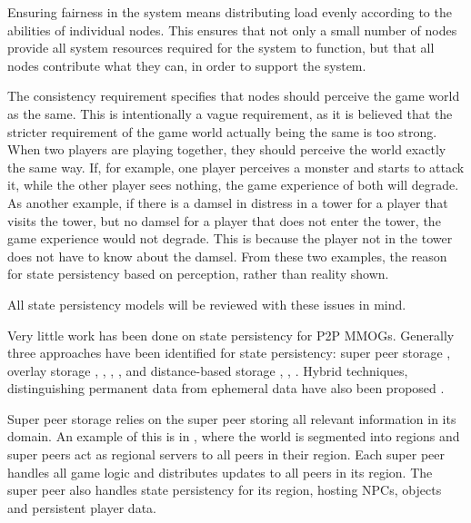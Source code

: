 \documentclass[journal,oneside,a4paper,onecolumn]{IEEEtran}
\begin{document}
Ensuring fairness in the system means distributing load evenly according to the abilities of individual nodes. This ensures that not only a small number of nodes provide all system resources required for the system to function, but that all nodes contribute what they can, in order to support the system.

The consistency requirement specifies that nodes should perceive the game world as the same. This is intentionally a vague requirement, as it is believed that the stricter requirement of the game world actually being the same is too strong. When two players are playing together, they should perceive the world exactly the same way. If, for example, one player perceives a monster and starts to attack it, while the other player sees nothing, the game experience of both will degrade. As another example, if there is a damsel in distress in a tower for a player that visits the tower, but no damsel for a player that does not enter the tower, the game experience would not degrade. This is because the player not in the tower does not have to know about the damsel. From these two examples, the reason for state persistency based on perception, rather than reality shown.

All state persistency models will be reviewed with these issues in mind.

Very little work has been done on state persistency for P2P MMOGs. Generally three approaches have been identified for state persistency: super peer storage \cite{knutsson_p2p_first}, overlay storage \cite{Douglas05enablingmassively}, \cite{using_freenet_storage}, \cite{overlay_storage1}, \cite{Fan_phd}, \cite{past_storage_focus} and distance-based storage \cite{Buyukkaya_voronoi_state_management}, \cite{Hu_voronoi_IM}, \cite{colyseus_distance_based}. Hybrid techniques, distinguishing permanent data from ephemeral data have also been proposed \cite{zoned_federation}.

Super peer storage relies on the super peer storing all relevant information in its domain. An example of this is in \cite{knutsson_p2p_first}, where the world is segmented into regions and super peers act as regional servers to all peers in their region. Each super peer handles all game logic and distributes updates to all peers in its region. The super peer also handles state persistency for its region, hosting NPCs, objects and persistent player data.
\end{document}
